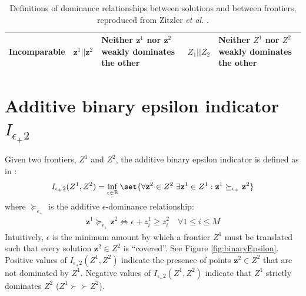 \begin{table}[ht]
{\begin{tabular}{|p{.2\linewidth}|p{.1\linewidth}|p{.3\linewidth}|p{.1\linewidth}|p{.3\linewidth}|}
Incomparable       & $\mathbf{z}^1 || \mathbf{z}^2$          & Neither $\mathbf{z}^1$ nor $\mathbf{z}^2$ weakly dominates the other                                                                                          & $Z_1 || Z_2$          & Neither $Z^1$ nor $Z^2$ weakly dominates the other                                                         \\ \hline
\end{tabular}%
}
\caption[Dominance relationships for frontiers and solutions]{Definitions of dominance relationships between solutions and between frontiers, reproduced from Zitzler \textit{et al.} \cite{zitzler2003performance}.}
\label{tab:dominanceRelations}
\end{table}

\section{Additive binary epsilon indicator $I_{\epsilon_+2}$}
\label{sec:binaryEpsIndicator}
Given two frontiers, $Z^1$ and $Z^2$, the additive binary epsilon indicator is defined as in \cite{zitzler2003performance}:
\begin{align}
I_{\epsilon_+2} (Z^1,Z^2) = \inf_{\epsilon \in \mathbb{R}} \set{\forall \mathbf{z}^2 \in Z^2 \; \exists \mathbf{z}^1 \in Z^1 : \mathbf{z}^1 \succeq_{\epsilon_+} \mathbf{z}^2}
\end{align}
where $\succeq_{\epsilon_+}$ is the additive $\epsilon$-dominance relationship:
\begin{align}
\mathbf{z}^1 \succeq_{\epsilon_+} \mathbf{z}^2 \iff \epsilon + z^1_i \ge z^2_i \quad \forall 1 \le i \le M
\end{align}
Intuitively, $\epsilon$ is the minimum amount by which a frontier $Z^1$ must be translated such that every solution $\mathbf{z}^2 \in Z^2$ is ``covered''. See Figure \ref{fig:binaryEpsilon}. Positive values of $I_{\epsilon_+2} (Z^1,Z^2)$ indicate the presence of points $\mathbf{z}^2 \in Z^2$ that are not dominated by $Z^1$. Negative values of $I_{\epsilon_+2} (Z^1,Z^2)$ indicate that $Z^1$ strictly dominates $Z^2$ ($Z^1 \succ \succ Z^2$).

